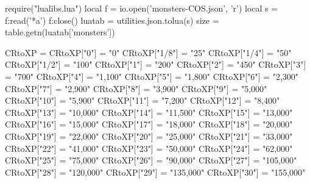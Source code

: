 \documentclass{article}
\begin{document}
    \begin{luacode}
        require("lualibs.lua")
        local f = io.open('monsters-COS.json', 'r')
        local s = f:read('*a')
        f:close()
        luatab = utilities.json.tolua(s)
        size = table.getn(luatab['monsters'])

        CRtoXP = {}
        CRtoXP["0"] = "0"
        CRtoXP["1/8"] = "25"
        CRtoXP["1/4"] = "50"
        CRtoXP["1/2"] = "100"
        CRtoXP["1"] = "200"
        CRtoXP["2"] = "450"
        CRtoXP["3"] = "700"
        CRtoXP["4"] = "1,100"
        CRtoXP["5"] = "1,800"
        CRtoXP["6"] = "2,300"
        CRtoXP["7"] = "2,900"
        CRtoXP["8"] = "3,900"
        CRtoXP["9"] = "5,000"
        CRtoXP["10"] = "5,900"
        CRtoXP["11"] = "7,200"
        CRtoXP["12"] = "8,400"
        CRtoXP["13"] = "10,000"
        CRtoXP["14"] = "11,500"
        CRtoXP["15"] = "13,000"
        CRtoXP["16"] = "15,000"
        CRtoXP["17"] = "18,000"
        CRtoXP["18"] = "20,000"
        CRtoXP["19"] = "22,000"
        CRtoXP["20"] = "25,000"
        CRtoXP["21"] = "33,000"
        CRtoXP["22"] = "41,000"
        CRtoXP["23"] = "50,000"
        CRtoXP["24"] = "62,000"
        CRtoXP["25"] = "75,000"
        CRtoXP["26"] = "90,000"
        CRtoXP["27"] = "105,000"
        CRtoXP["28"] = "120,000"
        CRtoXP["29"] = "135,000"
        CRtoXP["30"] = "155,000"
    \end{luacode}
\end{document}
